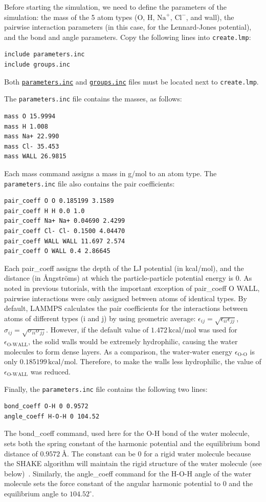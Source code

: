 \documentclass[9pt,tutorial]{livecoms}
\newcommand{\lmpcmd}[1]{\hspace{0pt}\colorbox{listing}{\textcolor{command}{\small{#1}}}\hspace{0pt}} %
\newcommand{\flecmd}[1]{\textcolor{command}{\texttt{#1}}} %
\newcommand{\dwlcmd}[1]{\textcolor{download}{\texttt{#1}}} %
\newcommand{\filepath}{https://raw.githubusercontent.com/lammpstutorials/lammpstutorials-article/main/files/}
\begin{document}
Before starting the simulation, we need to define the parameters of the
simulation: the mass of the 5 atom types (O, H, $\text{Na}^+$, $\text{Cl}^-$,
and wall), the pairwise interaction parameters (in this case, for the
Lennard-Jones potential), and the bond and angle parameters.  Copy the following
lines into \flecmd{create.lmp}:
\begin{lstlisting}
include parameters.inc
include groups.inc
\end{lstlisting}
Both \href{\filepath tutorial4/parameters.inc}{\dwlcmd{parameters.inc}}
and \href{\filepath tutorial4/groups.inc}{\dwlcmd{groups.inc}} files
must be located next to \flecmd{create.lmp}.

The \flecmd{parameters.inc} file contains the masses, as follows:
\begin{lstlisting}
mass O 15.9994
mass H 1.008
mass Na+ 22.990
mass Cl- 35.453
mass WALL 26.9815
\end{lstlisting}
Each \lmpcmd{mass} command assigns a mass in g/mol to an atom type.
The \flecmd{parameters.inc} file also contains the pair coefficients:
\begin{lstlisting}
pair_coeff O O 0.185199 3.1589
pair_coeff H H 0.0 1.0
pair_coeff Na+ Na+ 0.04690 2.4299
pair_coeff Cl- Cl- 0.1500 4.04470
pair_coeff WALL WALL 11.697 2.574
pair_coeff O WALL 0.4 2.86645
\end{lstlisting}
Each \lmpcmd{pair\_coeff} assigns the depth of the LJ potential (in
kcal/mol), and the distance (in Ångströms) at which the
particle-particle potential energy is 0.  As noted in previous
tutorials, with the important exception of \lmpcmd{pair\_coeff O WALL},
pairwise interactions were only assigned between atoms of identical
types.  By default, LAMMPS calculates the pair coefficients for the
interactions between atoms of different types (i and j) by using
geometric average: $\epsilon_{ij} = \sqrt{\epsilon_{ii} \epsilon_{jj}}$,
$\sigma_{ij} = \sqrt{\sigma_{ii} \sigma_{jj}}$.  However, if the default
value of $1.472\,\text{kcal/mol}$ was used for $\epsilon_\text{O-WALL}$,
the solid walls would be extremely hydrophilic, causing the water
molecules to form dense layers.  As a comparison, the water-water energy
$\epsilon_\text{O-O}$ is only $0.185199\,\text{kcal/mol}$.  Therefore,
to make the walls less hydrophilic, the value of
$\epsilon_\text{O-WALL}$ was reduced.

Finally, the \flecmd{parameters.inc} file contains the following two lines:
\begin{lstlisting}
bond_coeff O-H 0 0.9572
angle_coeff H-O-H 0 104.52
\end{lstlisting}
The \lmpcmd{bond\_coeff} command, used here for the O-H bond of the water
molecule, sets both the spring constant of the harmonic potential and the
equilibrium bond distance of $0.9572~\text{\AA{}}$.  The constant can be 0 for a
rigid water molecule because the SHAKE algorithm will maintain the rigid
structure of the water molecule (see below)~\cite{ryckaert1977numerical, andersen1983rattle}.
Similarly, the \lmpcmd{angle\_coeff} command for the H-O-H angle of the water molecule sets
the force constant of the angular harmonic potential to 0 and the equilibrium
angle to $104.52^\circ$.
\end{document}
